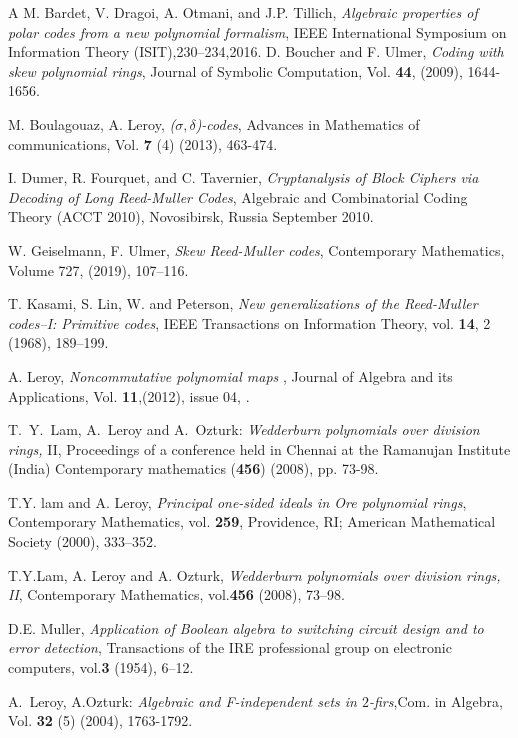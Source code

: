\documentclass{amsproc}
\numberwithin{equation}{section}
\begin{document}

\begin{thebibliography}{A}
 M. Bardet, V. Dragoi, A. Otmani, and J.P. Tillich, {\it Algebraic properties of polar codes from a new polynomial formalism},  IEEE International Symposium on Information Theory (ISIT),230--234,2016. 
 D. Boucher and F. Ulmer, {\it Coding with skew polynomial rings},
Journal of Symbolic Computation, Vol. {\bf 44}, (2009), 1644-1656.

 M. Boulagouaz, A. Leroy, {\it ($\sigma,\delta$)-codes},
Advances in Mathematics of communications, Vol. {\bf 7} (4) (2013), 463-474.  

 I. Dumer, R. Fourquet, and C. Tavernier, {\it Cryptanalysis of Block Ciphers via Decoding of Long Reed-Muller Codes}, Algebraic and Combinatorial Coding Theory (ACCT 2010), Novosibirsk, Russia September 2010. 



 W. Geiselmann, F. Ulmer, {\it Skew Reed-Muller codes},
Contemporary Mathematics, Volume 727, (2019), 107–116. 

 T. Kasami, S. Lin, W. and Peterson, 
{\it New generalizations of the Reed-Muller codes--I: Primitive codes},
IEEE Transactions on Information Theory,
vol. {\bf 14}, 2 (1968), 189--199.

 A. Leroy, {\it Noncommutative polynomial maps}
, Journal of Algebra and its Applications, Vol. {\bf 11},(2012), issue 04, .


 T.~Y.~Lam, A.~Leroy and A.~Ozturk: {\it Wedderburn
	polynomials over division rings,} II, Proceedings of a conference
held in Chennai at the Ramanujan Institute (India) Contemporary
mathematics ({\bf 456}) (2008), pp. 73-98.

 T.Y. lam and A. Leroy, {\it Principal one-sided ideals in Ore polynomial rings}, Contemporary Mathematics,
vol. {\bf 259}, Providence, RI; American Mathematical Society (2000), 333--352.

 T.Y.Lam, A. Leroy and A. Ozturk, {\it Wedderburn polynomials over division rings, II}, Contemporary Mathematics, vol.{\bf 456} (2008), 73--98.

 D.E. Muller, {\it Application of Boolean algebra to switching circuit design and to error detection}, Transactions of the IRE professional group on electronic computers, vol.{\bf 3} (1954), 6--12. 

 A.~Leroy, A.Ozturk: {\it Algebraic and		F-independent sets in $2$-firs},Com. in Algebra, Vol. {\bf 32} (5)	(2004), 1763-1792.
 

\end{thebibliography}
\end{document}
